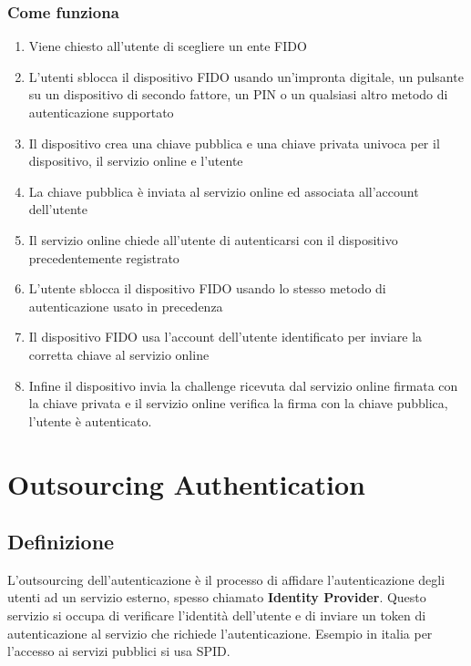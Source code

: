         \subsubsection{Come funziona}
            \begin{enumerate}
                \item Viene chiesto all'utente di scegliere un ente FIDO
                \item L'utenti sblocca il dispositivo FIDO usando un'impronta digitale, un pulsante su un dispositivo di secondo fattore, un PIN o un qualsiasi altro metodo di autenticazione supportato
                \item Il dispositivo crea una chiave pubblica e una chiave privata univoca per il dispositivo, il servizio online e l'utente
                \item La chiave pubblica è inviata al servizio online ed associata all'account dell'utente
                \item Il servizio online chiede all'utente di autenticarsi con il dispositivo precedentemente registrato
                \item L'utente sblocca il dispositivo FIDO usando lo stesso metodo di autenticazione usato in precedenza
                \item Il dispositivo FIDO usa l'account dell'utente identificato per inviare la corretta chiave al servizio online
                \item Infine il dispositivo invia la challenge ricevuta dal servizio online firmata con la chiave privata e il servizio online verifica la firma con la chiave pubblica, l'utente è autenticato.
            \end{enumerate}
\section{Outsourcing Authentication}
    \label{sec:outsourcing-authentication}
    \subsection{Definizione}
        L'outsourcing dell'autenticazione è il processo di affidare l'autenticazione degli utenti ad un servizio esterno, spesso chiamato \textbf{Identity Provider}. Questo servizio si occupa di verificare l'identità dell'utente e di inviare un token di autenticazione al servizio che richiede l'autenticazione. Esempio in italia per l'accesso ai servizi pubblici si usa SPID.
